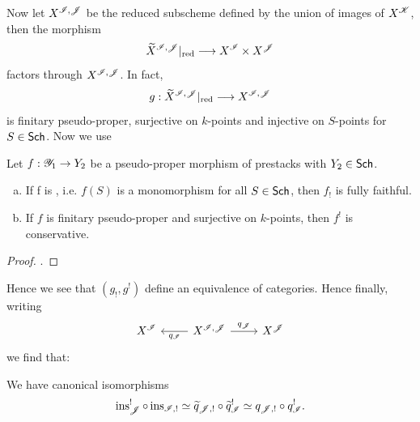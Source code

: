 \documentclass[oneside]{amsart}
\begin{document}
Now let $X^{\mathscr{I},\mathscr{J}}$ be the reduced subscheme defined by the union of images of $X^{\mathscr{K}}$, then the morphism
\[
	\wt{X}^{\CI,\CJ}|\red \to X^{\CI}\times X^{\CJ}
\] 
factors through $X^{\mathscr{I},\mathscr{J}}$. In fact,
\[
	g:\wt{X}^{\CI,\CJ}|\red \to X^{\CI,\CJ}
\] 
is finitary pseudo-proper, surjective on $k$-points and injective on $S$-points for $S\in \mathsf{Sch}$. Now we use
\begin{lemma}
	Let $f:\CY_1\to Y_2$ be a pseudo-proper morphism of prestacks with $Y_2\in \mathsf{Sch}$.
	\begin{enumerate}[(a)]
		\item If f is , i.e. $f(S)$ is a monomorphism for all $S\in \mathsf{Sch}$, then $f_!$ is fully faithful.
		\item If $f$ is finitary pseudo-proper and surjective on $k$-points, then $f^{!}$ is conservative.
	\end{enumerate}
\end{lemma}
\begin{proof}
	\cite[Lemma~7.4.11]{abott}.
\end{proof}
Hence we see that $(g_!,g^!)$ define an equivalence of categories. Hence finally, writing
\[
\begin{tikzcd}
	X^{\CI} & X^{\CI,\CJ} \ar[l,"q_{\CI}"] \ar[r,"q_{\CJ}"] & X^{\CJ}
\end{tikzcd}
\] 
we find that:
\begin{corollary}
	We have canonical isomorphisms
	\[
		\operatorname{ins}_{\mathscr{J}}^{!}\circ \operatorname{ins}_{\mathscr{I},!} \simeq \widetilde{q}_{\mathscr{J},!}\circ \widetilde{q}_{\mathscr{I}}^{!} \simeq q_{\mathscr{J},!}\circ q_{\mathscr{I}}^{!}.
	\] 
\end{corollary}

\appendix
\printbibliography
\end{document}
